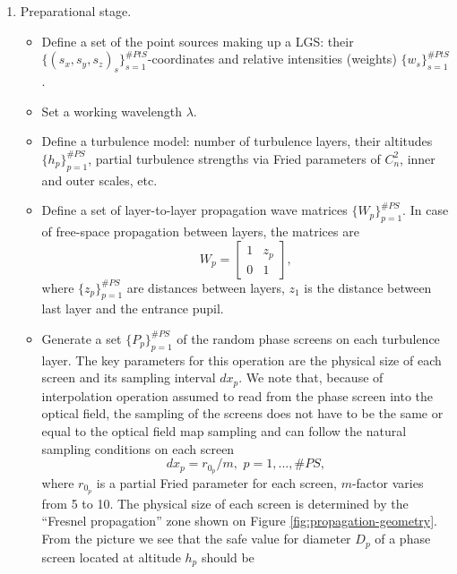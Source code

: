 \begin{enumerate}
  \item Preparational stage.
  \begin{itemize}
    \item Define a set of the point sources making up a LGS: their
    $\{ (s_{x},s_{y},s_{z})_{s} \}_{s=1}^{\#PtS}$-coordinates and relative
    intensities (weights) $\{ w_{s} \}_{s=1}^{\#PtS}$.
    \item Set a working wavelength $\lambda$.
    \item Define a turbulence model: number of turbulence layers, their
    altitudes $\{ h_{p} \}_{p=1}^{\#PS}$, partial turbulence strengths via Fried
    parameters of $C_{n}^{2}$, inner and outer scales, etc.
    \item Define a set of layer-to-layer propagation wave matrices $\{ W_{p}
    \}_{p=1}^{\#PS}$. In case of free-space propagation between layers, the
    matrices are
    \begin{equation} \label{eq:free-propagation-matrices}
      W_{p} = \left[ \begin{array}{cc} 1 & z_{p} \\ 0 & 1 \end{array} \right],
    \end{equation}
    where $\{ z_{p} \}_{p=1}^{\#PS}$ are distances between layers, $z_{1}$
    is the distance between last layer and the entrance pupil.
    \item Generate a set $\{ P_{p} \}_{p=1}^{\#PS}$ of the random phase screens
    on each turbulence layer. The key
    parameters for this operation are the physical size of each screen and its
    sampling interval $dx_{p}$. We note that, because of interpolation operation
    assumed to read
    from the phase screen into the optical field, the sampling of the screens
    does not have to be the same or equal to the optical field map sampling and
    can follow the natural sampling conditions on each screen
    \begin{equation} \label{eq:phase-screen-sampling}
      dx_{p} = r_{0_{p}} / m, \,\, p = 1,...,\#PS,
    \end{equation}
    where $r_{0_{p}}$ is a partial Fried parameter for each screen, $m$-factor
    varies from 5 to 10. The physical size of each screen is determined by the
    ``Fresnel propagation'' zone shown on Figure \ref{fig:propagation-geometry}.
    From the picture we see that the safe value for diameter $D_{p}$ of a phase
    screen located at altitude $h_{p}$ should be
    \begin{equation} \label{eq:phase-screen-size}

\end{equation}
\end{itemize}
\end{enumerate}
